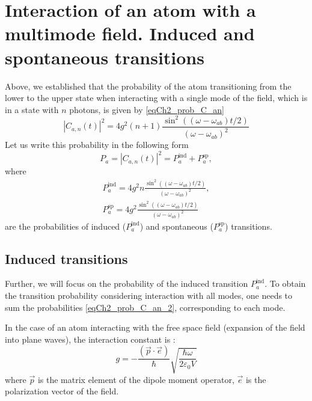 \section{Interaction of an atom with a multimode field. Induced and
  spontaneous transitions}
Above, we established that the probability of the atom transitioning from the lower to
the upper state when interacting with a single mode of the field, which is in
a state with $n$ photons, is given by \eqref{eqCh2_prob_C_an} 
\begin{equation}
\left|C_{a,n}\left(t\right)\right|^2 = 4 g^2 \left(n+1\right)
  \frac{\sin^2\left(\left(\omega - 
  \omega_{ab}\right)t/2\right)} {\left(\omega - 
  \omega_{ab}\right)^2}
  \nonumber
\end{equation}
Let us write this probability in the following form
\begin{equation}
  P_a = \left|C_{a,n}\left(t\right)\right|^2 =
  P_a^{\mbox{ind}} + P_a^{\mbox{sp}},
  \label{eqCh2_prob_C_an_2_1}
\end{equation}
where
\begin{eqnarray}
  P_a^{\mbox{ind}} = 4 g^2 n
  \frac{\sin^2\left(\left(\omega - 
  \omega_{ab}\right)t/2\right)} {\left(\omega - 
    \omega_{ab}\right)^2},
  \nonumber \\
  P_a^{\mbox{sp}} = 4 g^2 
  \frac{\sin^2\left(\left(\omega - 
  \omega_{ab}\right)t/2\right)} {\left(\omega - 
  \omega_{ab}\right)^2}
  \label{eqCh2_prob_C_an_2}
\end{eqnarray}
are the probabilities of induced ($P_a^{\mbox{ind}}$)
and spontaneous ($P_a^{\mbox{sp}}$) transitions.

\subsection{Induced transitions}
Further, we will focus on the probability of the induced transition
$P_a^{\mbox{ind}}$.
To obtain the transition probability considering interaction with all
modes, one needs to sum the probabilities \eqref{eqCh2_prob_C_an_2},
corresponding to each mode. 

In the case of an atom interacting with the free space field
(expansion of the field into plane waves), the interaction constant is
\cite{bLuisell1972}: 
\begin{equation}
g = - \frac{\left(\vec{p}\cdot\vec{e}\right)}{\hbar}
\sqrt{\frac{\hbar \omega}{2 \varepsilon_0 V}}
\end{equation}
where $\vec{p}$ is the matrix element of the dipole moment operator,
$\vec{e}$ is the polarization vector of the field. 

